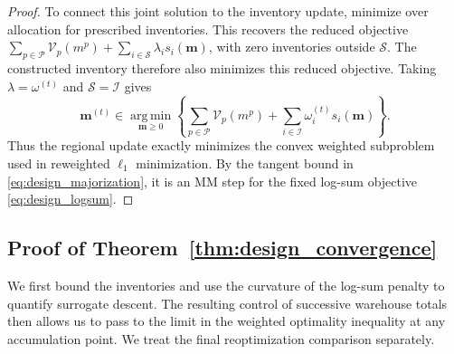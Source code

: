\documentclass[a4paper,fleqn]{cas-sc}
\theoremstyle{remark}
\theoremstyle{plain}
\begin{document}
\begin{proof}
To connect this joint solution to the inventory update, minimize over allocation for prescribed inventories. This recovers the reduced objective $\sum_{p\in\mathcal P}\mathcal V_p(m^p)+\sum_{i\in\mathcal S}\lambda_i s_i(\mathbf m)$, with zero inventories outside $\mathcal S$. The constructed inventory therefore also minimizes this reduced objective. Taking $\lambda=\omega^{(t)}$ and $\mathcal S=\mathcal I$ gives
\begin{equation}
    \mathbf m^{(t)}\in\operatorname*{arg\,min}_{\mathbf m\ge0}\left\{\sum_{p\in\mathcal P}\mathcal V_p(m^p)+\sum_{i\in\mathcal I}\omega_i^{(t)}s_i(\mathbf m)\right\}.
    \label{eq:appendix_weighted_minimizer}
\end{equation}
Thus the regional update exactly minimizes the convex weighted subproblem used in reweighted $\ell_1$ minimization. By the tangent bound in \eqref{eq:design_majorization}, it is an MM step for the fixed log-sum objective \eqref{eq:design_logsum}.
\end{proof}

\subsection{Proof of Theorem~\ref{thm:design_convergence}}\label{app:design_convergence_proof}

We first bound the inventories and use the curvature of the log-sum penalty to quantify surrogate descent. The resulting control of successive warehouse totals then allows us to pass to the limit in the weighted optimality inequality at any accumulation point. We treat the final reoptimization comparison separately.
\end{document}
